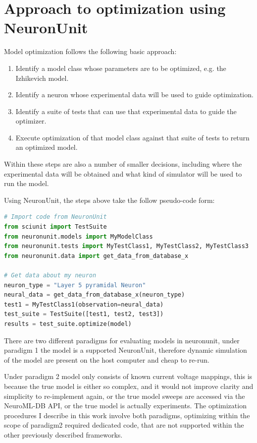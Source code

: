 \section{Approach to optimization using NeuronUnit}
Model optimization follows the following basic approach:
\begin{enumerate}
	\item Identify a model class whose parameters are to be optimized, e.g. the Izhikevich model.
	\item Identify a neuron whose experimental data will be used to guide optimization.
	\item Identify a suite of tests that can use that experimental data to guide the optimizer.
	\item Execute optimization of that model class against that suite of tests to return an optimized model.
\end{enumerate}
Within these steps are also a number of smaller decisions, including where the experimental data will be obtained and what kind of simulator will be used to run the model.

Using NeuronUnit, the steps above take the follow pseudo-code form:

\begin{lstlisting}[language=python]
# Import code from NeuronUnit
from sciunit import TestSuite
from neuronunit.models import MyModelClass
from neuronunit.tests import MyTestClass1, MyTestClass2, MyTestClass3
from neuronunit.data import get_data_from_database_x

# Get data about my neuron
neuron_type = "Layer 5 pyramidal Neuron"
neural_data = get_data_from_database_x(neuron_type)
test1 = MyTestClass1(observation=neural_data)
test_suite = TestSuite([test1, test2, test3])
results = test_suite.optimize(model)
\end{lstlisting}

There are two different paradigms for evaluating models in neuronunit, under paradigm 1 the model is a supported NeuronUnit, therefore dynamic simulation of the model are present on the host computer and cheap to re-run.

Under paradigm 2 model only consists of known current voltage mappings, this is because the true model is either so complex, and it would not improve clarity and simplicity to re-implement again, or the true model sweeps are accessed via the NeuroML-DB API, or the true model is actually experiments. The optimization procedures I describe in this work involve both paradigms, optimizing within the scope of paradigm2 required dedicated code, that are not supported within the other previously described frameworks.

